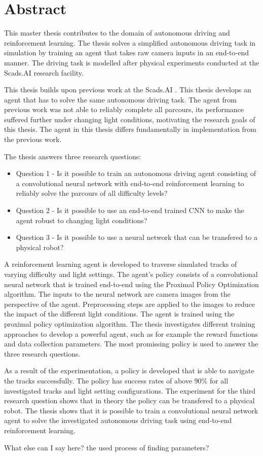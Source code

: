 \section*{Abstract}
\label{sec:Abstract}

This master thesis contributes to the domain of autonomous driving and reinforcement learning. The thesis solves a simplified autonomous driving task in simulation by training an agent that takes raw camera inputs in an end-to-end manner. The driving task is modelled after physical experiments conducted at the Scads.AI research facility.

This thesis builds upon previous work at the Scads.AI \autocite{maximilian}. This thesis develops an agent that has to solve the same autonomous driving task. The agent from previous work was not able to reliably complete all parcours, its performance suffered further under changing light conditions, motivating the research goals of this thesis. The agent in this thesis differs fundamentally in implementation from the previous work.

The thesis answers three research questions:
\begin{itemize}
    \item Question 1 - Is it possible to train an autonomous driving agent consisting of a convolutional neural network with end-to-end reinforcement learning to reliably solve the parcours of all difficulty levels?
    \item Question 2 - Is it possible to use an end-to-end trained CNN to make the agent robust to changing light conditions?
    \item Question 3 - Is it possible to use a neural network that can be transfered to a physical robot?
\end{itemize}
A reinforcement learning agent is developed to traverse simulated tracks of varying difficulty and light settings. The agent's policy consists of a convolutional neural network that is trained end-to-end using the Proximal Policy Optimization algorithm. The inputs to the neural network are camera images from the perspective of the agent. Preprocessing steps are applied to the images to reduce the impact of the different light conditions. The agent is trained using the proximal policy optimization algorithm.
The thesis investigates different training approaches to develop a powerful agent, such as for example the reward functions and data collection parameters. The most promissing policy is used to answer the three research questions.

As a result of the experimentation, a policy is developed that is able to navigate the tracks successfully. The policy has success rates of above 90\% for all investigated tracks and light setting configurations. The experiment for the third research question shows that in theory the policy can be transfered to a physical robot.
The thesis shows that it is possible to train a convolutional neural network agent to solve the investigated autonomous driving task using end-to-end reinforcement learning.


What else can I say here?
the used process of finding parameters?


